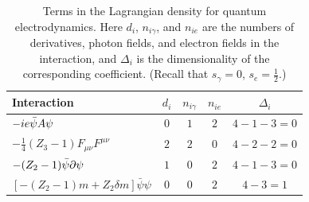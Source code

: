\begingroup
\renewcommand{\thetable}{12.\arabic{table}}
\setcounter{table}{0}
\begin{table}[tbp]
\centering
\caption{Terms in the Lagrangian density for quantum electrodynamics. Here
$d_i$, $n_{i\gamma}$, and $n_{ie}$ are the numbers of derivatives, photon
fields, and electron fields in the interaction, and $\Delta_i$ is the
dimensionality of the corresponding coefficient. (Recall that $s_\gamma=0$,
$s_e=\tfrac12$.)}
\label{tab:12.1}
\renewcommand{\arraystretch}{1.15}
\setlength{\tabcolsep}{0.7em}
\begin{tabular}{@{}lcccc@{}}
\hline\hline
Interaction & $d_i$ & $n_{i\gamma}$ & $n_{ie}$ & $\Delta_i$ \\
\hline
$-ie\bar\psi\sl{A}\psi$ & $0$ & $1$ & $2$ & $4-1-3=0$ \\
$-\tfrac14(Z_3-1)F_{\mu\nu}F^{\mu\nu}$ & $2$ & $2$ & $0$ & $4-2-2=0$ \\
$-(Z_2-1)\bar\psi\sl{\partial}\psi$ & $1$ & $0$ & $2$ & $4-1-3=0$ \\
$[-(Z_2-1)m+Z_2\delta m]\bar\psi\psi$ & $0$ & $0$ & $2$ & $4-3=1$ \\
\hline\hline
\end{tabular}
\end{table}
\endgroup
